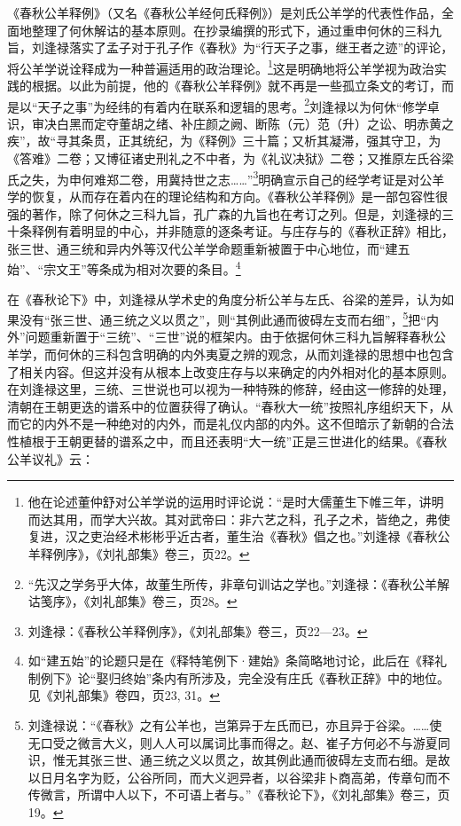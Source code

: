 \documentclass[a4paper, 12pt, openright]{ctexbook}
\begin{document}
《春秋公羊释例》（又名《春秋公羊经何氏释例》）是刘氏公羊学的代表性作品，全面地整理了何休解诂的基本原则。在抄录编撰的形式下，通过重申何休的三科九旨，刘逢禄落实了孟子对于孔子作《春秋》为“行天子之事，继王者之迹”的评论，将公羊学说诠释成为一种普遍适用的政治理论。\footnote{他在论述董仲舒对公羊学说的运用时评论说：“是时大儒董生下帷三年，讲明而达其用，而学大兴故。其对武帝曰：非六艺之科，孔子之术，皆绝之，弗使复进，汉之吏治经术彬彬乎近古者，董生治《春秋》倡之也。”刘逢禄《春秋公羊释例序》，《刘礼部集》卷三，页22。}这是明确地将公羊学视为政治实践的根据。以此为前提，他的《春秋公羊释例》就不再是一些孤立条文的考订，而是以“天子之事”为经纬的有着内在联系和逻辑的思考。\footnote{“先汉之学务乎大体，故董生所传，非章句训诂之学也。”刘逢禄：《春秋公羊解诂笺序》，《刘礼部集》卷三，页28。}刘逢禄以为何休“修学卓识，审决白黑而定夺董胡之绪、补庄颜之阙、断陈（元）范（升）之讼、明赤黄之疾”，故“寻其条贯，正其统纪，为《释例》三十篇；又析其凝滞，强其守卫，为《答难》二卷；又博征诸史刑礼之不中者，为《礼议决狱》二卷；又推原左氏谷梁氏之失，为申何难郑二卷，用冀持世之志……”\footnote{刘逢禄：《春秋公羊释例序》，《刘礼部集》卷三，页22—23。}明确宣示自己的经学考证是对公羊学的恢复，从而存在着内在的理论结构和方向。《春秋公羊释例》是一部包容性很强的著作，除了何休之三科九旨，孔广森的九旨也在考订之列。但是，刘逢禄的三十条释例有着明显的中心，并非随意的逐条考证。与庄存与的《春秋正辞》相比，张三世、通三统和异内外等汉代公羊学命题重新被置于中心地位，而“建五始”、“宗文王”等条成为相对次要的条目。\footnote{如“建五始”的论题只是在《释特笔例下·建始》条简略地讨论，此后在《释礼制例下》论“娶归终始”条内有所涉及，完全没有庄氏《春秋正辞》中的地位。见《刘礼部集》卷四，页23, 31。}

在《春秋论下》中，刘逢禄从学术史的角度分析公羊与左氏、谷梁的差异，认为如果没有“张三世、通三统之义以贯之”，则“其例此通而彼碍左支而右细”，\footnote{刘逢禄说：“《春秋》之有公羊也，岂第异于左氏而已，亦且异于谷梁。……使无口受之微言大义，则人人可以属词比事而得之。赵、崔子方何必不与游夏同识，惟无其张三世、通三统之义以贯之，故其例此通而彼碍左支而右细。是故以日月名字为贬，公谷所同，而大义迥异者，以谷梁非卜商高弟，传章句而不传微言，所谓中人以下，不可语上者与。”《春秋论下》，《刘礼部集》卷三，页19。}把“内外”问题重新置于“三统”、“三世”说的框架内。由于依据何休三科九旨解释春秋公羊学，而何休的三科包含明确的内外夷夏之辨的观念，从而刘逢禄的思想中也包含了相关内容。但这并没有从根本上改变庄存与以来确定的内外相对化的基本原则。在刘逢禄这里，三统、三世说也可以视为一种特殊的修辞，经由这一修辞的处理，清朝在王朝更迭的谱系中的位置获得了确认。“春秋大一统”按照礼序组织天下，从而它的内外不是一种绝对的内外，而是礼仪内部的内外。这不但暗示了新朝的合法性植根于王朝更替的谱系之中，而且还表明“大一统”正是三世进化的结果。《春秋公羊议礼》云：
\end{document}
